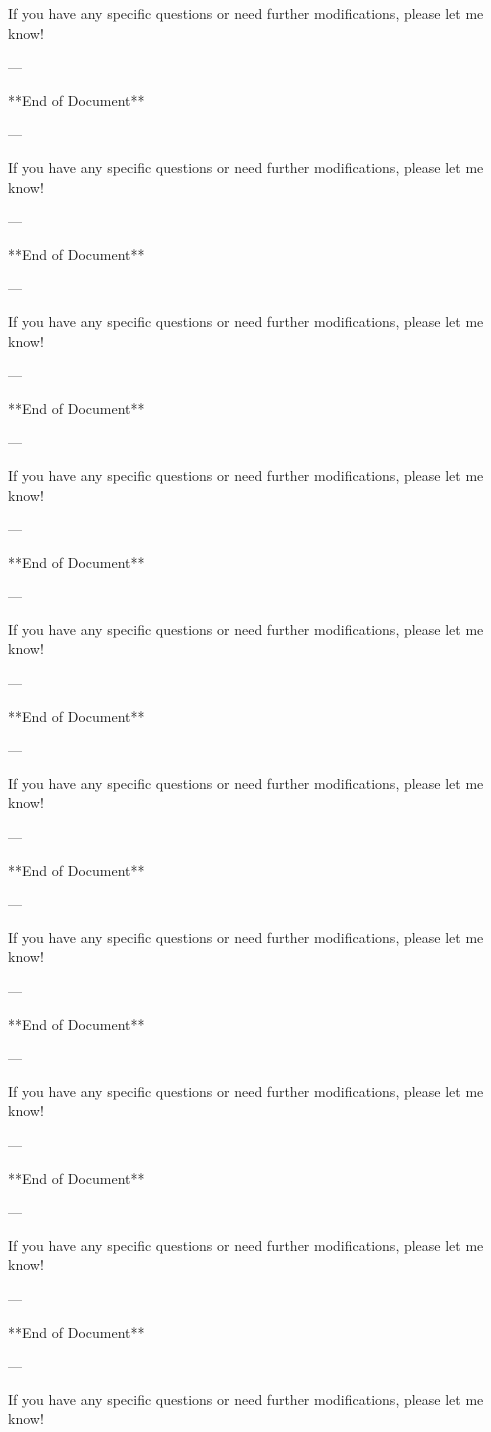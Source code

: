 If you have any specific questions or need further modifications, please let me know! 

--- 

**End of Document** 

--- 

If you have any specific questions or need further modifications, please let me know! 

--- 

**End of Document** 

--- 

If you have any specific questions or need further modifications, please let me know! 

--- 

**End of Document** 

--- 

If you have any specific questions or need further modifications, please let me know! 

--- 

**End of Document** 

--- 

If you have any specific questions or need further modifications, please let me know! 

--- 

**End of Document** 

--- 

If you have any specific questions or need further modifications, please let me know! 

--- 

**End of Document** 

--- 

If you have any specific questions or need further modifications, please let me know! 

--- 

**End of Document** 

--- 

If you have any specific questions or need further modifications, please let me know! 

--- 

**End of Document** 

--- 

If you have any specific questions or need further modifications, please let me know! 

--- 

**End of Document** 

--- 

If you have any specific questions or need further modifications, please let me know! 


